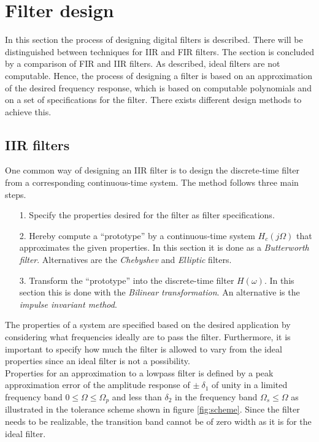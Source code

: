 \section{Filter design}
In this section the process of designing digital filters is described. There will be distinguished between techniques for IIR and FIR filters. The section is concluded by a comparison of FIR and IIR filters. As described, ideal filters are not computable. Hence, the process of designing a filter is based on an approximation of the desired frequency response, which is based on computable polynomials and on a set of specifications for the filter. There exists different design methods to achieve this.

\subsection{IIR filters}
One common way of designing an IIR filter is to design the discrete-time filter from a corresponding continuous-time system. The method follows three main steps. 
\begin{itemize}
\item[1.] Specify the properties desired for the filter as filter specifications.
\item[2.] Hereby compute a ``prototype'' by a continuous-time system $H_c(j\Omega)$ that approximates the given properties. In this section it is done as a \textit{Butterworth filter}. Alternatives are the \textit{Chebyshev} and \textit{Elliptic} filters.
\item[3.] Transform the ``prototype'' into the discrete-time filter $H(\omega)$. In this section this is done with the \textit{Bilinear transformation}. An alternative is the \textit{impulse invariant method}.
\end{itemize}

The properties of a system are specified based on the desired application by considering what frequencies ideally are to pass the filter. Furthermore, it is important to specify how much the filter is allowed to vary from the ideal properties since an ideal filter is not a possibility. \\
Properties for an approximation to a lowpass filter is defined by a peak approximation error of the amplitude response of $\pm \ \delta_1$ of unity in a limited frequency band $0 \leq \Omega \leq \Omega_p $ and less than $\delta_2$ in the frequency band $\Omega_s \leq \Omega$ as illustrated in the tolerance scheme shown in figure \ref{fig:scheme}. Since the filter needs to be realizable, the transition band cannot be of zero width as it is for the ideal filter.

